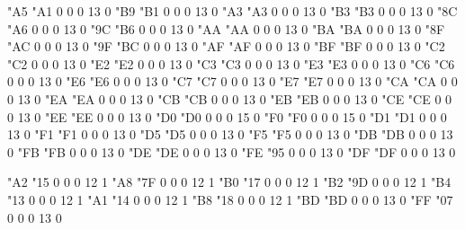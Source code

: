 \setcharcode  "A5  "A1    0    0     0  13  0  
\setcharcode  "B9  "B1    0    0     0  13  0  
\setcharcode  "A3  "A3    0    0     0  13  0  \expandto {\L}
\setcharcode  "B3  "B3    0    0     0  13  0  \expandto {\l}
\setcharcode  "8C  "A6    0    0     0  13  0  
\setcharcode  "9C  "B6    0    0     0  13  0  
\setcharcode  "AA  "AA    0    0     0  13  0  
\setcharcode  "BA  "BA    0    0     0  13  0  
\setcharcode  "8F  "AC    0    0     0  13  0  
\setcharcode  "9F  "BC    0    0     0  13  0  
\setcharcode  "AF  "AF    0    0     0  13  0  
\setcharcode  "BF  "BF    0    0     0  13  0  
\setcharcode  "C2  "C2    0    0     0  13  0  
\setcharcode  "E2  "E2    0    0     0  13  0  
\setcharcode  "C3  "C3    0    0     0  13  0  
\setcharcode  "E3  "E3    0    0     0  13  0  
\setcharcode  "C6  "C6    0    0     0  13  0  
\setcharcode  "E6  "E6    0    0     0  13  0  
\setcharcode  "C7  "C7    0    0     0  13  0  
\setcharcode  "E7  "E7    0    0     0  13  0  
\setcharcode  "CA  "CA    0    0     0  13  0  
\setcharcode  "EA  "EA    0    0     0  13  0  
\setcharcode  "CB  "CB    0    0     0  13  0  
\setcharcode  "EB  "EB    0    0     0  13  0  
\setcharcode  "CE  "CE    0    0     0  13  0  
\setcharcode  "EE  "EE    0    0     0  13  0  \expandto {\^\i}
\setcharcode  "D0  "D0    0    0     0  15  0  %
\setcharcode  "F0  "F0    0    0     0  15  0  %
\setcharcode  "D1  "D1    0    0     0  13  0  
\setcharcode  "F1  "F1    0    0     0  13  0  
\setcharcode  "D5  "D5    0    0     0  13  0  
\setcharcode  "F5  "F5    0    0     0  13  0  
\setcharcode  "DB  "DB    0    0     0  13  0  
\setcharcode  "FB  "FB    0    0     0  13  0  
\setcharcode  "DE  "DE    0    0     0  13  0  
\setcharcode  "FE  "95    0    0     0  13  0   %
\setcharcode  "DF  "DF    0    0     0  13  0  \expandto {\ss}

\setcharcode  "A2  "15    0    0     0  12  1  %
\setcharcode  "A8  "7F    0    0     0  12  1  %
\setcharcode  "B0  "17    0    0     0  12  1  %
\setcharcode  "B2  "9D    0    0     0  12  1  %
\setcharcode  "B4  "13    0    0     0  12  1  %
\setcharcode  "A1  "14    0    0     0  12  1  %
\setcharcode  "B8  "18    0    0     0  12  1  %
\setcharcode  "BD  "BD    0    0     0  13  0   %
\setcharcode  "FF  "07    0    0     0  13  0    %

